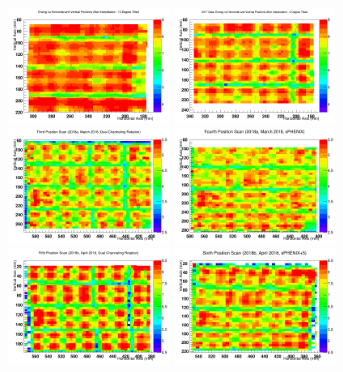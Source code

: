 \documentclass[hidelinks,11pt]{article}
\numberwithin{figure}{section}
\numberwithin{table}{section}
\begin{document}
\begin{figure}[hbtp]
\begin{center}
\includegraphics[width=0.38\textwidth]{Plots/InterFits/Inter20172ndScan.png}
\includegraphics[width=0.38\textwidth]{Plots/InterFits/Inter20173rdScan.png}
\includegraphics[width=0.38\textwidth]{Plots/InterFits/Inter20183rdScan.png}
\includegraphics[width=0.38\textwidth]{Plots/InterFits/Inter20184thScan.png}
\includegraphics[width=0.38\textwidth]{Plots/InterFits/Inter20185thScan.png}
\includegraphics[width=0.38\textwidth]{Plots/InterFits/Inter20186thScan.png}

\end{center}
\end{figure}
\end{document}
